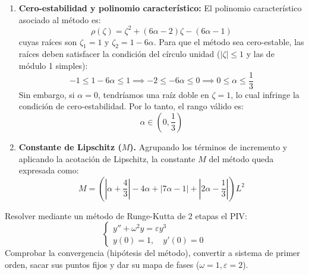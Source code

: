 \begin{sol}
\begin{enumerate}
    \item \textbf{Cero-estabilidad y polinomio característico:}
    El polinomio característico asociado al método es:
    $$
    \rho(\zeta) = \zeta^2 + (6\alpha - 2)\zeta - (6\alpha - 1)
    $$
     cuyas raíces son $\zeta_1 = 1$ y $\zeta_2 = 1 - 6\alpha$. 
    Para que el método sea cero-estable, las raíces deben satisfacer la condición del círculo unidad ($|\zeta| \le 1$ y las de módulo 1 simples):
    $$
    -1 \le 1 - 6\alpha \le 1 \implies -2 \le -6\alpha \le 0 \implies 0 \le \alpha \le \frac{1}{3}
    $$
    Sin embargo, si $\alpha = 0$, tendríamos una raíz doble en $\zeta = 1$, lo cual infringe la condición de cero-estabilidad. Por lo tanto, el rango válido es:
    $$
    \alpha \in \left(0, \frac{1}{3}\right)
    $$

    \item \textbf{Constante de Lipschitz ($M$).}
    Agrupando los términos de incremento y aplicando la acotación de Lipschitz, la constante $M$ del método queda expresada como:
    $$
    M = \left( \left|\alpha + \frac{4}{3}\right| - 4\alpha + |7\alpha - 1| + \left|2\alpha - \frac{1}{3}\right| \right) L^2
    $$
\end{enumerate}
\end{sol}
\begin{ejer}
Resolver mediante un método de Runge-Kutta de 2 etapas el PIV:
$$
\begin{cases}
    y'' + \omega^2 y = \varepsilon y^3 \\
    y(0) = 1, \quad y'(0) = 0
\end{cases}
$$
Comprobar la convergencia (hipótesis del método), convertir a sistema de primer orden, sacar sus puntos fijos y dar su mapa de fases ($\omega =1, \varepsilon=2$).
\end{ejer}

